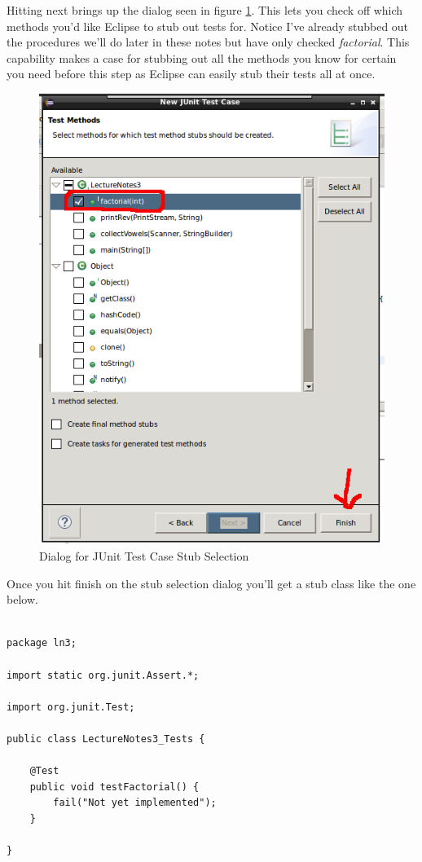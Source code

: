 \documentclass[]{tufte-handout}
\begin{document}
Hitting next brings up the dialog seen in figure \ref{fig:selectstubs}. This lets you check off which methods you'd like Eclipse to stub out tests for. Notice I've already stubbed out the procedures we'll do later in these notes but have only checked \textit{factorial}. This capability makes a case for stubbing out all the methods you know for certain you need before this step as Eclipse can easily stub their tests all at once. 

\vspace{.1in}
\begin{center}
\begin{figure}[!htb]
\includegraphics[scale=.5]{Eclipse-JUnitCaseStubSelect.png}
\caption{Dialog for JUnit Test Case Stub Selection} 
\label{fig:selectstubs}
\end{figure}
\end{center}
\vspace{.1in}

Once you hit finish on the stub selection dialog you'll get a stub class like the one below. 
\begin{lstlisting}

package ln3;

import static org.junit.Assert.*;

import org.junit.Test;

public class LectureNotes3_Tests {

	@Test
	public void testFactorial() {
		fail("Not yet implemented");
	}

}

\end{lstlisting}
\end{document}
